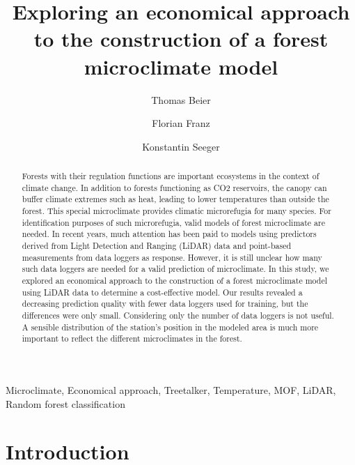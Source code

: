 \documentclass[5p]{elsarticle} %
\begin{document}
\begin{frontmatter}

  \title{Exploring an economical approach to the construction of a forest microclimate model}
    \author[Philipps-University Marburg]{Thomas Beier}
    \author[Philipps-University Marburg]{Florian Franz}
    \author[Philipps-University Marburg]{Konstantin Seeger}
      \address[Philipps-University Marburg]{Philipps-University Marburg,
FB 19 Geography, Deutschhausstraße 10, 35032 Marburg, Germany}
    
  \begin{abstract}
  Forests with their regulation functions are important ecosystems in the context of climate change. In addition to forests functioning as CO2 reservoirs, the canopy can buffer climate extremes such as heat, leading to lower temperatures than outside the forest. This special microclimate provides climatic microrefugia for many species. For identification purposes of such microrefugia, valid models of forest microclimate are needed. In recent years, much attention has been paid to models using predictors derived from Light Detection and Ranging (LiDAR) data and point-based measurements from data loggers as response. However, it is still unclear how many such data loggers are needed for a valid prediction of microclimate. In this study, we explored an economical approach to the construction of a forest microclimate model using LiDAR data to determine a cost-effective model. Our results revealed a decreasing prediction quality with fewer data loggers used for training, but the differences were only small. Considering only the number of data loggers is not useful. A sensible distribution of the station's position in the modeled area is much more important to reflect the different microclimates in the forest.
  \end{abstract}
   \begin{keyword} Microclimate, Economical approach, Treetalker, Temperature, MOF, LiDAR, Random forest classification\end{keyword}
 \end{frontmatter}

\newpage

\hypertarget{introduction}{%
\section{Introduction}\label{introduction}}
\end{document}
